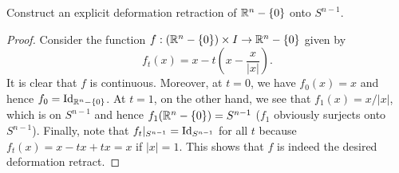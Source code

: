 \documentclass{../../mathnotes}
\begin{document}
\begin{prop}
    Construct an explicit deformation retraction of $\mathbb{R}^n-\left\{ 0 \right\}$ onto $S^{n-1}$.
\end{prop}
\begin{proof}
    Consider the function $f:\left(\mathbb{R}^n-\left\{ 0 \right\}\right)\times I\to \mathbb{R}^n-\left\{ 0 \right\}$ given by
    \[f_t(x)=x-t\left(x - \frac{x}{|x|}\right).\]
    It is clear that $f$ is continuous. Moreover, at $t=0$, we have $f_0(x)=x$ and hence $f_0=\operatorname{Id}_{\mathbb{R}^n-\left\{ 0 \right\}}$.
    At $t=1$, on the other hand, we see that $f_1(x)=x/|x|$, which is on $S^{n-1}$ and hence $f_1(\mathbb{R}^n-\left\{ 0 \right\})=S^{n-1}$
    ($f_1$ obviously surjects onto $S^{n-1}$). Finally, note that $f_t|_{S^{n-1}}=\operatorname{Id}_{S^{n-1}}$ for all $t$ because
    $f_t(x)=x-tx+tx=x$ if $|x|=1$. This shows that $f$ is indeed the desired deformation retract.
\end{proof}
\end{document}
